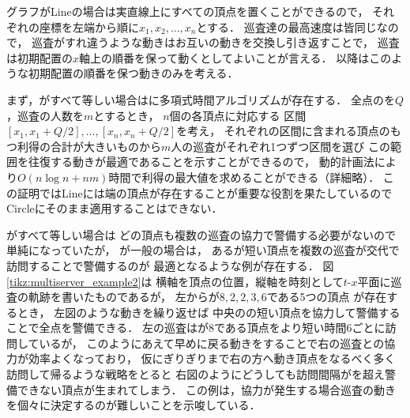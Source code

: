 グラフがLineの場合は実直線上にすべての頂点を置くことができるので，
それぞれの座標を左端から順に$x_1, x_2, \ldots, x_n$とする．
巡査達の最高速度は皆同じなので，
巡査がすれ違うような動きはお互いの動きを交換し引き返すことで，
巡査は初期配置の$x$軸上の順番を保って動くとしてよいことが言える．
以降はこのような初期配置の順番を保つ動きのみを考える．



まず，{\timelimit}がすべて等しい場合は{\optpp}に多項式時間アルゴリズムが存在する．
%
全点の{\timelimit}を$Q$，巡査の人数を$m$とするとき，
$n$個の各頂点に対応する
区間$[x_1, x_1 + Q/2], \ldots, [x_n, x_n + Q/2]$を考え，
それぞれの区間に含まれる頂点のもつ利得の合計が大きいものから$m$人の巡査がそれぞれ1つずつ区間を選び
この範囲を往復する動きが最適であることを示すことができるので，
動的計画法により$O(n \log n + nm)$時間で利得の最大値を求めることができる（詳細略）．
%
この証明ではLineには端の頂点が存在することが重要な役割を果たしているので
Circleにそのまま適用することはできない．



{\timelimit}がすべて等しい場合は
どの頂点も複数の巡査の協力で警備する必要がないので単純になっていたが，
%
{\timelimit}が一般の場合は，
ある{\timelimit}が短い頂点を複数の巡査が交代で訪問することで警備するのが
最適となるような例が存在する．
%
図\ref{tikz:multiserver_example2}は
横軸を頂点の位置，縦軸を時刻として$t$-$x$平面に巡査の軌跡を書いたものであるが，
%
左から{\timelimit}が$8,2,2,3,6$である5つの頂点
が存在するとき，
左図のような動きを繰り返せば
中央の{\timelimit}の短い頂点を協力して警備することで全点を警備できる．
左の巡査は{\timelimit}が$8$である頂点をより短い時間$6$ごとに訪問しているが，
このようにあえて早めに戻る動きをすることで右の巡査との協力が効率よくなっており，
仮に{\timelimit}ぎりぎりまで右の方へ動き頂点をなるべく多く訪問して帰るような戦略をとると
右図のようにどうしても訪問間隔が{\timelimit}を超え警備できない頂点が生まれてしまう．
%
この例は，協力が発生する場合巡査の動きを個々に決定するのが難しいことを示唆している．
%


